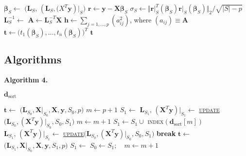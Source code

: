 \documentclass[a4paper,oneside,11pt,DIV=12]{scrartcl}
\begin{document}
\begin{algorithmic}[1]
		\State $\bm \beta_S \gets$ $\big(\bm L_S$, $(\bm L_S, \bm (X^T \bm y)\vert_S$$\big)$
		\State $\bm r \gets \bm y - \bm X  \bm \beta_S$ 
		\State $\sigma_S \gets \big\Vert \bm r\vert_S^T(\bm \beta_S) \bm r\vert_S(\bm \beta_S) \big \Vert_2 / \sqrt{\vert S \vert - p}$ 
		\State $\bm L_S^{-1} \gets$ 
		\State $\bm A \gets \bm L_S^{-T}\bm X$
		\State $\bm h \gets \sum_{j =1, \ldots, p} (a_{ij}^2)$, \quad where $(a_{ij}) \equiv \bm A$
		\State $\bm t \gets \big(t_1(\bm \beta_S), \ldots, t_n(\bm \beta_S)\big)^T$ 
		\State \Return $\bm t$
	\EndFunction
\end{algorithmic}




\subsection{Algorithms}


\vspace{1em}
\noindent \textbf{\sffamily Algorithm 4.}  
\begin{algorithmic}[1]
	\hypertarget{alg:alg4}{\Require $\bm d_{\mathrm{sort}}$} 
	\State $\bm t \gets$ $\big( \bm L_{S_0}, \bm X\vert_{S_0}, \bm X, \bm y, S_0, p\big)$
	\State $m \gets p + 1$
	\State $S_1 \gets$ 
		\State $\bm L_{S_1}, \, (\bm X^T  \bm y)\vert_{S_1} \gets$ \hyperlink{alg:update}{\textsc{update}}$\big(\bm L_{S_0}, (\bm X^T \bm y)\vert_{S_0}, S_0, S_1\big)$
				\State $m \gets m + 1$
				\State $S_1 \gets S_1 \cup$ \textsc{index}$(\bm d_{\mathrm{sort}}[m])$
				\State $\bm L_{S_1}, \, (\bm X^T  \bm y)\vert_{S_1} \gets$ \hyperlink{alg:update}{\textsc{update}}$\big(\bm L_{S_0}, (\bm X^T \bm y)\vert_{S_0}, S_0, S_1\big)$
					\State \textbf{break}
				\EndIf
			\EndWhile
		\EndIf
		\State $\bm t \gets$ $\big(\bm L_{S_1}, \bm X\vert_{S_0}, \bm X, \bm y, S_1, p\big)$
		\State $S_1 \gets$ 
		\State $S_0 \gets S_1; \quad m \gets m + 1$
		\EndWhile
\end{algorithmic}
\end{document}
